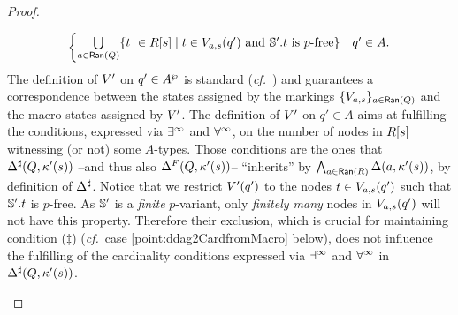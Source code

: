 \begin{proof}
\begin{enumerate}[label = (\Alph*), ref = \Alph*]
\begin{enumerate}[label = (\roman*), ref = \roman*]
\begin{align*}
\begin{cases}
               \bigcup\limits_{a \in \Ran(Q)} \{t\ \in \R{s} \mid t \in \val_{a,s}(q') \text{ and }\model'.t\text{ is $p$-free}\}              & q' \in A.
           \end{cases}
       \end{align*}
       The definition of $V'$ on $q' \in A^{\wp}$ is standard (\emph{cf.}~\cite[Prop. 2.21]{Zanasi:Thesis:2012}) and guarantees a correspondence between the states assigned by the markings $\{V_{a,s}\}_{a \in \mathsf{Ran}(Q)}$ and the macro-states assigned by $V'$. The definition of $V'$ on $q' \in A$ aims at fulfilling the conditions, expressed via $\exists^\infty$ and $\forall^\infty$, on the number of nodes in $R[s]$ witnessing (or not) some $A$-types. Those conditions are the ones that $\Delta^{\sharp}(Q,\kappa'(s))$ --and thus also $\Delta^{F}(Q,\kappa'(s))$-- ``inherits'' by $\bigwedge_{a \in \mathsf{Ran}(R)} \Delta(a,\kappa'(s))$, by definition of $\Delta^{\sharp}$. Notice that we restrict $V'(q')$ to the nodes $t \in V_{a,s}(q')$ such that $\mathbb{S}'.t$ is $p$-free. As $\mathbb{S}'$ is a \emph{finite} $p$-variant, only \emph{finitely many} nodes in $V_{a,s}(q')$ will not have this property. Therefore their exclusion, which is crucial for maintaining condition ($\ddag$) (\emph{cf.}~case \eqref{point:ddag2CardfromMacro} below), does not influence the fulfilling of the cardinality conditions expressed via $\exists^\infty$ and $\forall^\infty$ in $\Delta^{\sharp}(Q,\kappa'(s))$.


\end{enumerate}
\end{enumerate}
\end{proof}
